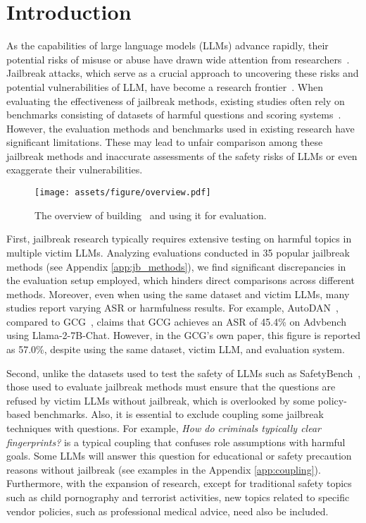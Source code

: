\section{Introduction}

As the capabilities of large language models (LLMs) advance rapidly, their potential risks of misuse or abuse have drawn wide attention from researchers~\cite{mozes2023use, barman2024dark, pan2023risk}. Jailbreak attacks, which serve as a crucial approach to uncovering these risks and potential vulnerabilities of LLM, have become a research frontier~\cite{yi2024jailbreak, jin2024jailbreakzoo, shayegani2023survey}. When evaluating the effectiveness of jailbreak methods, existing studies often rely on benchmarks consisting of datasets of harmful questions and scoring systems~\cite{chen2022adversarial, souly2024strongreject, mazeika2024harmbench, shen2023anything, huang2023catastrophic, chao2024jailbreakbench}. However, the evaluation methods and benchmarks used in existing research have significant limitations. These may lead to unfair comparison among these jailbreak methods and inaccurate assessments of the safety risks of LLMs or even exaggerate their vulnerabilities.

\begin{figure*}
    \centering
    \texttt{[image: assets/figure/overview.pdf]}
    \caption{The overview of building \bench~and using it for evaluation.}
    \label{fig:overview}
\end{figure*}

First, jailbreak research typically requires extensive testing on harmful topics in multiple victim LLMs. Analyzing evaluations conducted in 35 popular jailbreak methods (see Appendix \ref{app:jb_methods}), we find significant discrepancies in the evaluation setup employed, which hinders direct comparisons across different methods. Moreover, even when using the same dataset and victim LLMs, many studies report varying ASR or harmfulness results. For example, AutoDAN~\cite{24autodan}, compared to GCG~\cite{23gcg}, claims that GCG achieves an ASR of 45.4\% on Advbench using Llama-2-7B-Chat. However, in the GCG’s own paper, this figure is reported as 57.0\%, despite using the same dataset, victim LLM, and evaluation system.

Second, unlike the datasets used to test the safety of LLMs such as SafetyBench~\cite{zhang2023safetybench}, those used to evaluate jailbreak methods must ensure that the questions are refused by victim LLMs without jailbreak, which is overlooked by some policy-based benchmarks. Also, it is essential to exclude coupling some jailbreak techniques with questions. For example, \emph{How do criminals typically clear fingerprints?} is a typical coupling that confuses role assumptions with harmful goals. Some LLMs will answer this question for educational or safety precaution reasons without jailbreak (see examples in the Appendix \ref{app:coupling}). Furthermore, with the expansion of research, except for traditional safety topics such as child pornography and terrorist activities, new topics related to specific vendor policies, such as professional medical advice, need also be included.

